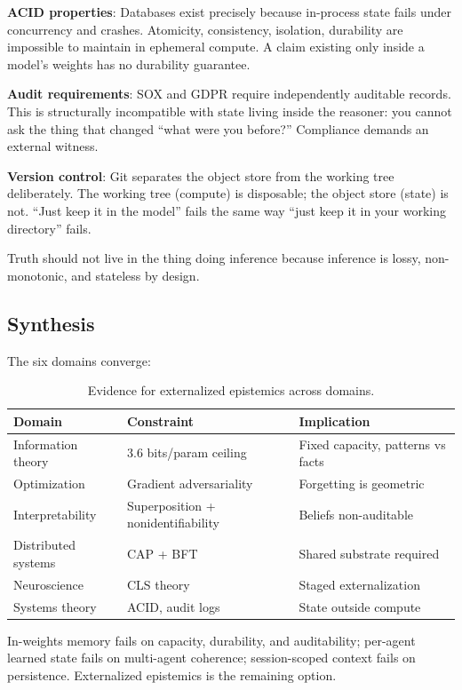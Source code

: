 \documentclass[11pt,letterpaper]{article}
\begin{document}
\textbf{ACID properties}: Databases exist precisely because in-process state fails under concurrency and crashes. Atomicity, consistency, isolation, durability are impossible to maintain in ephemeral compute. A claim existing only inside a model's weights has no durability guarantee.

\textbf{Audit requirements}: SOX and GDPR require independently auditable records. This is structurally incompatible with state living inside the reasoner: you cannot ask the thing that changed ``what were you before?'' Compliance demands an external witness.

\textbf{Version control}: Git separates the object store from the working tree deliberately. The working tree (compute) is disposable; the object store (state) is not. ``Just keep it in the model'' fails the same way ``just keep it in your working directory'' fails.

Truth should not live in the thing doing inference because inference is lossy, non-monotonic, and stateless by design.

\subsection{Synthesis}

The six domains converge:

\begin{table}[H]
\centering
\caption{Evidence for externalized epistemics across domains.}
\label{tab:evidence}
\begin{tabular}{@{}lll@{}}
\toprule
\textbf{Domain} & \textbf{Constraint} & \textbf{Implication} \\
\midrule
Information theory & 3.6 bits/param ceiling & Fixed capacity, patterns vs facts \\
Optimization & Gradient adversariality & Forgetting is geometric \\
Interpretability & Superposition + nonidentifiability & Beliefs non-auditable \\
Distributed systems & CAP + BFT & Shared substrate required \\
Neuroscience & CLS theory & Staged externalization \\
Systems theory & ACID, audit logs & State outside compute \\
\bottomrule
\end{tabular}
\end{table}

In-weights memory fails on capacity, durability, and auditability; per-agent learned state fails on multi-agent coherence; session-scoped context fails on persistence. Externalized epistemics is the remaining option.
\end{document}
